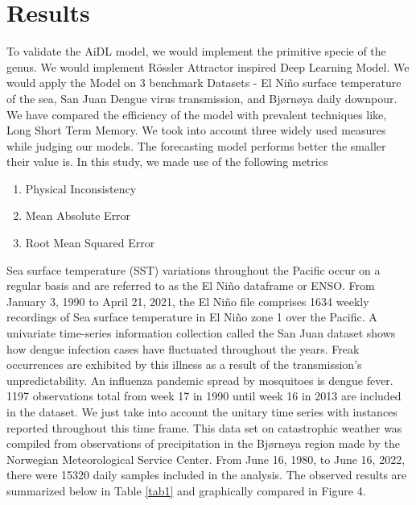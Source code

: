 \documentclass[conference]{IEEEtran}
\begin{document}
\section{Results}\label{sec4}
To validate the AiDL model, we would implement the primitive specie of the genus. We would implement Rössler Attractor inspired Deep Learning Model. We would apply the Model on 3 benchmark Datasets - El Niño surface temperature of the sea, San Juan Dengue virus transmission, and Bjørnøya daily downpour. We have compared the efficiency of the model with prevalent techniques like, Long Short Term Memory. We took into account three widely used measures while judging our models. The forecasting model performs better the smaller their value is. In this study, we made use of the following metrics
\begin{enumerate}
\item Physical Inconsistency
\item Mean Absolute Error
\item Root Mean Squared Error
\end{enumerate}
Sea surface temperature (SST) variations throughout the Pacific occur on a regular basis and are referred to as the El Niño dataframe or ENSO. From January 3, 1990 to April 21, 2021, the El Niño file comprises 1634 weekly recordings of Sea surface temperature in El Niño zone 1 over the Pacific. A univariate time-series information collection called the San Juan dataset shows how dengue infection cases have fluctuated throughout the years. Freak occurrences are exhibited by this illness as a result of the transmission's unpredictability. An influenza pandemic spread by mosquitoes is dengue fever. 1197 observations total from week 17 in 1990 until week 16 in 2013 are included in the dataset. We just take into account the unitary time series with instances reported throughout this time frame. This data set on catastrophic weather was compiled from observations of precipitation in the Bjørnøya region made by the Norwegian Meteorological Service Center. From June 16, 1980, to June 16, 2022, there were 15320 daily samples included in the analysis. 
The observed results are summarized below in Table \ref{tab1} and graphically compared in Figure 4. 
\end{document}
